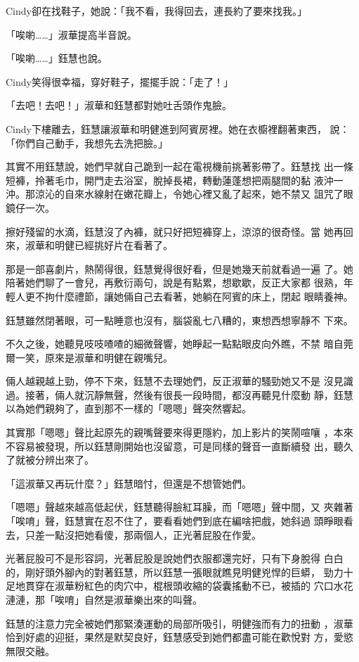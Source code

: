 Cindy卻在找鞋子，她說：「我不看，我得回去，連長約了要來找我。」

「唉喲……」淑華提高半音說。

「唉喲……」鈺慧也說。

Cindy笑得很幸福，穿好鞋子，擺擺手說：「走了！」

「去吧！去吧！」淑華和鈺慧都對她吐舌頭作鬼臉。

Cindy下樓離去，鈺慧讓淑華和明健進到阿賓房裡。她在衣櫥裡翻著東西，
說：「你們自己動手，我想先去洗把臉。」

其實不用鈺慧說，她們早就自己跪到一起在電視機前挑著影帶了。鈺慧找
出一條短褲，拎著毛巾，開門走去浴室，脫掉長裙，轉動蓮蓬想把兩腿間的黏
液沖一沖。那涼沁的自來水線射在嫩花瓣上，令她心裡又亂了起來，她不禁又
詛咒了眼鏡仔一次。

擦好殘留的水滴，鈺慧沒了內褲，就只好把短褲穿上，涼涼的很奇怪。當
她再回來，淑華和明健已經挑好片在看著了。

那是一部喜劇片，熱鬧得很，鈺慧覺得很好看，但是她幾天前就看過一遍
了。她陪著她們聊了一會兒，再敷衍兩句，說是有點累，想歇歇，反正大家都
很熟，年輕人更不拘什麼禮節，讓她倆自己去看著，她躺在阿賓的床上，閉起
眼睛養神。

鈺慧雖然閉著眼，可一點睡意也沒有，腦袋亂七八糟的，東想西想寧靜不
下來。

不久之後，她聽見吱吱喳喳的細微聲響，她睜起一點點眼皮向外瞧，不禁
暗自莞爾一笑，原來是淑華和明健在親嘴兒。

倆人越親越上勁，停不下來，鈺慧不去理她們，反正淑華的騷勁她又不是
沒見識過。接著，倆人就沉靜無聲，然後有很長一段時間，都沒再聽見什麼動
靜，鈺慧以為她們親夠了，直到那不一樣的「嗯嗯」聲突然響起。

其實那「嗯嗯」聲比起原先的親嘴聲要來得更隱約，加上影片的笑鬧喧嚷
，本來不容易被發現，所以鈺慧剛開始也沒留意，可是同樣的聲音一直斷續發
出，聽久了就被分辨出來了。

「這淑華又再玩什麼？」鈺慧暗忖，但還是不想管她們。

「嗯嗯」聲越來越高低起伏，鈺慧聽得臉紅耳臊，而「嗯嗯」聲中間，又
夾雜著「唉唷」聲，鈺慧實在忍不住了，要看看她們到底在編啥把戲，她斜過
頭睜眼看去，只差一點沒把她看傻，那兩個人，正光著屁股在作愛。

光著屁股可不是形容詞，光著屁股是說她們衣服都還完好，只有下身脫得
白白的，剛好頭外腳內的對著鈺慧，所以鈺慧一張眼就瞧見明健兇悍的巨蟒，
勁力十足地貫穿在淑華粉紅色的肉穴中，棍根頭收縮的袋囊搖動不已，被插的
穴口水花漣漣，那「唉唷」自然是淑華樂出來的叫聲。

鈺慧的注意力完全被她們那緊湊運動的局部所吸引，明健強而有力的扭動
，淑華恰到好處的迎挺，果然是默契良好，鈺慧感受到她們都盡可能在歡悅對
方，愛慾無限交融。

